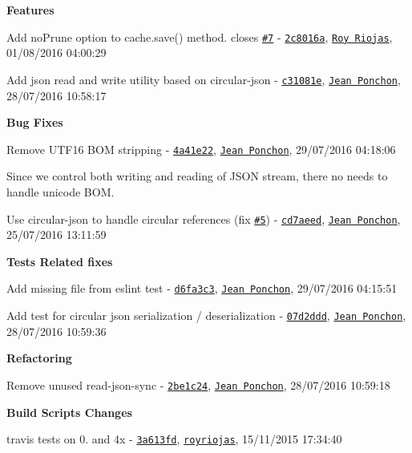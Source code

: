 \begin{DoxyItemize}
\item {\bfseries Features}
\begin{DoxyItemize}
\item Add no\+Prune option to cache.\+save() method. closes \href{https://github.com/royriojas/flat-cache/issues/7}{\tt \#7} -\/ \href{https://github.com/royriojas/flat-cache/commit/2c8016a}{\tt 2c8016a}, \href{https://github.com/Roy Riojas}{\tt Roy Riojas}, 01/08/2016 04\+:00\+:29
\item Add json read and write utility based on circular-\/json -\/ \href{https://github.com/royriojas/flat-cache/commit/c31081e}{\tt c31081e}, \href{https://github.com/Jean Ponchon}{\tt Jean Ponchon}, 28/07/2016 10\+:58\+:17
\end{DoxyItemize}
\item {\bfseries Bug Fixes}
\begin{DoxyItemize}
\item Remove U\+T\+F16 B\+OM stripping -\/ \href{https://github.com/royriojas/flat-cache/commit/4a41e22}{\tt 4a41e22}, \href{https://github.com/Jean Ponchon}{\tt Jean Ponchon}, 29/07/2016 04\+:18\+:06

Since we control both writing and reading of J\+S\+ON stream, there no needs to handle unicode B\+OM.
\item Use circular-\/json to handle circular references (fix \href{https://github.com/royriojas/flat-cache/issues/5}{\tt \#5}) -\/ \href{https://github.com/royriojas/flat-cache/commit/cd7aeed}{\tt cd7aeed}, \href{https://github.com/Jean Ponchon}{\tt Jean Ponchon}, 25/07/2016 13\+:11\+:59
\end{DoxyItemize}
\item {\bfseries Tests Related fixes}
\begin{DoxyItemize}
\item Add missing file from eslint test -\/ \href{https://github.com/royriojas/flat-cache/commit/d6fa3c3}{\tt d6fa3c3}, \href{https://github.com/Jean Ponchon}{\tt Jean Ponchon}, 29/07/2016 04\+:15\+:51
\item Add test for circular json serialization / deserialization -\/ \href{https://github.com/royriojas/flat-cache/commit/07d2ddd}{\tt 07d2ddd}, \href{https://github.com/Jean Ponchon}{\tt Jean Ponchon}, 28/07/2016 10\+:59\+:36
\end{DoxyItemize}
\item {\bfseries Refactoring}
\begin{DoxyItemize}
\item Remove unused read-\/json-\/sync -\/ \href{https://github.com/royriojas/flat-cache/commit/2be1c24}{\tt 2be1c24}, \href{https://github.com/Jean Ponchon}{\tt Jean Ponchon}, 28/07/2016 10\+:59\+:18
\end{DoxyItemize}
\item {\bfseries Build Scripts Changes}
\begin{DoxyItemize}
\item travis tests on 0. and 4x -\/ \href{https://github.com/royriojas/flat-cache/commit/3a613fd}{\tt 3a613fd}, \href{https://github.com/royriojas}{\tt royriojas}, 15/11/2015 17\+:34\+:40
\end{DoxyItemize}
\end{DoxyItemize}

